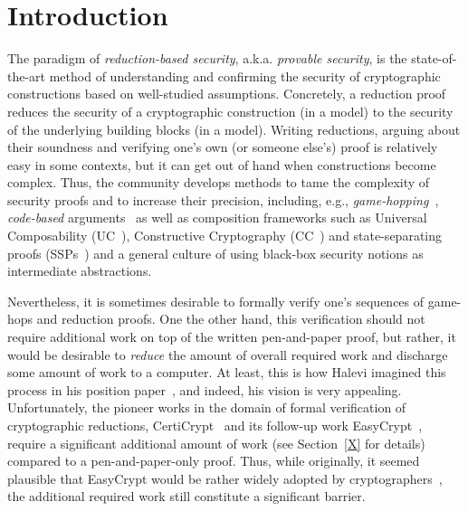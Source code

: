 \section{Introduction}
The paradigm of \emph{reduction-based security}, a.k.a. \emph{provable security}, is the state-of-the-art method of understanding and confirming the security of cryptographic constructions based on well-studied assumptions. Concretely, a reduction proof reduces the security of a cryptographic construction (in a model) to the security of the underlying building blocks (in a model). Writing reductions, arguing about their soundness and verifying one's own (or someone else's) proof is relatively easy in some contexts, but it can get out of hand when constructions become complex. Thus, the community develops methods to tame the complexity of security proofs and to increase their precision, including, e.g., \emph{game-hopping}~\cite{EPRINT:Shoup04}, \emph{code-based} arguments~\cite{EC:BelRog06} as well as composition frameworks such as Universal Composability (UC~\cite{FOCS:Canetti01}), Constructive Cryptography (CC~\cite{FC:Maurer10}) and state-separating proofs (SSPs~\cite{X}) and a general culture of using black-box security notions as intermediate abstractions.

Nevertheless, it is sometimes desirable to formally verify one's sequences of game-hops and reduction proofs. One the other hand, this verification should not require additional work on top of the written pen-and-paper proof, but rather, it would be desirable to \emph{reduce} the amount of overall required work and discharge some amount of work to a computer. At least, this is how Halevi imagined this process in his position paper~\cite{X}, and indeed, his vision is very appealing. Unfortunately, the pioneer works in the domain of formal verification of cryptographic reductions, CertiCrypt~\cite{X} and its follow-up work EasyCrypt~\cite{X}, require a significant additional amount of work (see Section~\ref{X} for details) compared to a pen-and-paper-only proof. Thus, while originally, it seemed plausible that EasyCrypt would be rather widely adopted by cryptographers~\cite[page 1]{X}, the additional required work still constitute a significant barrier.


